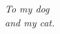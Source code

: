 \cleardoublepage
\thispagestyle{empty}
\begin{center}
\Large\itshape
To my dog\\
and my cat.
\end{center}
